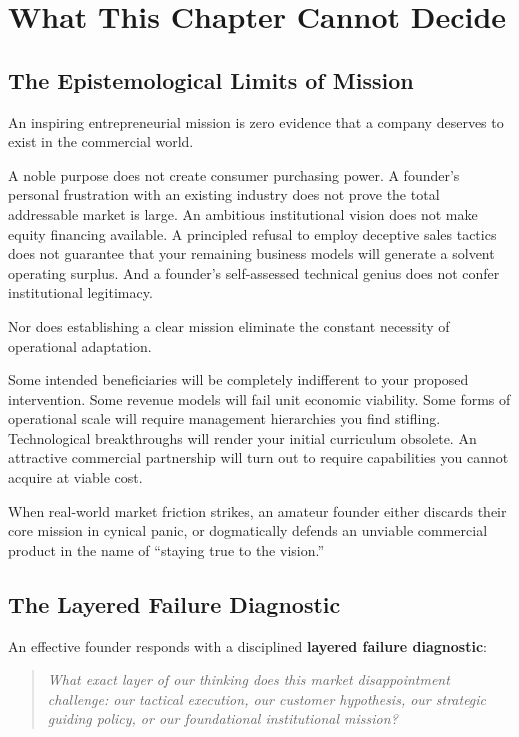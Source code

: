 \section{What This Chapter Cannot Decide}

\subsection{The Epistemological Limits of Mission}

An inspiring entrepreneurial mission is zero evidence that a company deserves to exist in the commercial world.

A noble purpose does not create consumer purchasing power. A founder's personal frustration with an existing industry does not prove the total addressable market is large. An ambitious institutional vision does not make equity financing available. A principled refusal to employ deceptive sales tactics does not guarantee that your remaining business models will generate a solvent operating surplus. And a founder's self-assessed technical genius does not confer institutional legitimacy.

Nor does establishing a clear mission eliminate the constant necessity of operational adaptation.

Some intended beneficiaries will be completely indifferent to your proposed intervention. Some revenue models will fail unit economic viability. Some forms of operational scale will require management hierarchies you find stifling. Technological breakthroughs will render your initial curriculum obsolete. An attractive commercial partnership will turn out to require capabilities you cannot acquire at viable cost.

When real-world market friction strikes, an amateur founder either discards their core mission in cynical panic, or dogmatically defends an unviable commercial product in the name of ``staying true to the vision.''

\subsection{The Layered Failure Diagnostic}

An effective founder responds with a disciplined \textbf{layered failure diagnostic}:

\begin{quote}
\itshape
What exact layer of our thinking does this market disappointment challenge: our tactical execution, our customer hypothesis, our strategic guiding policy, or our foundational institutional mission?
\end{quote}

